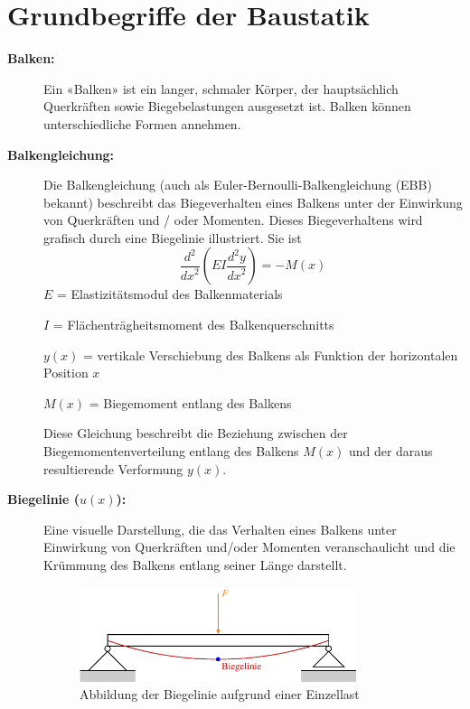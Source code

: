 %
%
%
%
\section{Grundbegriffe der Baustatik}
\label{balken:section:teil1}
\begin{description}
\item[\textbf{Balken:}] Ein «Balken» ist ein langer, schmaler Körper, der hauptsächlich Querkräften sowie Biegebelastungen ausgesetzt ist.
Balken können unterschiedliche Formen annehmen.

\item[\textbf{Balkengleichung:}] Die Balkengleichung (auch als Euler-Bernoulli-Balkengleichung (EBB) bekannt) beschreibt das Biegeverhalten eines Balkens unter der Einwirkung von Querkräften und / oder Momenten.
Dieses Biegeverhaltens wird grafisch durch eine Biegelinie illustriert. \cite{balken:Biegelinie} Sie ist
\begin{equation}
	\frac{d^2}{{dx}^2}\left(EI\frac{d^2y}{{dx}^2}\right)
	=-M(x)
\end{equation}
$E$ = Elastizitätsmodul des Balkenmaterials

$I$ = Flächenträgheitsmoment des Balkenquerschnitts

$y(x)$ = vertikale Verschiebung des Balkens als Funktion der horizontalen Position $x$

$M(x)$ = Biegemoment entlang des Balkens

Diese Gleichung beschreibt die Beziehung zwischen der Biegemomentenverteilung entlang des Balkens $M(x)$ und der daraus resultierende Verformung $y(x)$.

\item[\textbf{Biegelinie ($u(x)$):}] Eine visuelle Darstellung, die das Verhalten eines Balkens unter Einwirkung von Querkräften und/oder Momenten veranschaulicht und die Krümmung des Balkens entlang seiner Länge darstellt. \cite{balken:Biegelinie}
\begin{figure}
	\centering
	\includegraphics[width=0.8\textwidth]{papers/balken/images/teil1/Biegelinie1.pdf}
	\caption{Abbildung der Biegelinie aufgrund einer Einzellast}
	\label{fig:Abbildung der Biegelinie aufgrund einer Einzellast}
\end{figure}


\end{description}
